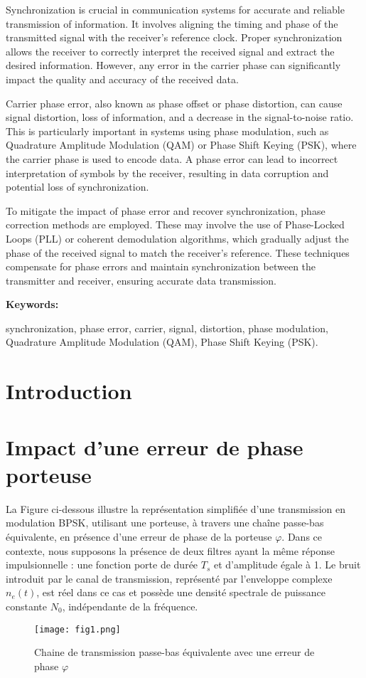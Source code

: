 \documentclass[11pt]{article}
\begin{document}
Synchronization is crucial in communication systems for accurate and reliable transmission of information. It involves aligning the timing and phase of the transmitted signal with the receiver's reference clock. Proper synchronization allows the receiver to correctly interpret the received signal and extract the desired information. However, any error in the carrier phase can significantly impact the quality and accuracy of the received data.

Carrier phase error, also known as phase offset or phase distortion, can cause signal distortion, loss of information, and a decrease in the signal-to-noise ratio. This is particularly important in systems using phase modulation, such as Quadrature Amplitude Modulation (QAM) or Phase Shift Keying (PSK), where the carrier phase is used to encode data. A phase error can lead to incorrect interpretation of symbols by the receiver, resulting in data corruption and potential loss of synchronization.

To mitigate the impact of phase error and recover synchronization, phase correction methods are employed. These may involve the use of Phase-Locked Loops (PLL) or coherent demodulation algorithms, which gradually adjust the phase of the received signal to match the receiver's reference. These techniques compensate for phase errors and maintain synchronization between the transmitter and receiver, ensuring accurate data transmission.

{\bfseries Keywords:}

synchronization, phase error, carrier, signal, distortion, phase modulation, Quadrature Amplitude Modulation (QAM), Phase Shift Keying (PSK).

\newpage
\tableofcontents
\listoffigures

\newpage
\section{Introduction}

\section{Impact d'une erreur de phase porteuse}
La Figure ci-dessous illustre la représentation simplifiée d'une transmission en modulation BPSK, utilisant une porteuse, à travers une chaîne passe-bas équivalente, en présence d'une erreur de phase de la porteuse $\varphi$. Dans ce contexte, nous supposons la présence de deux filtres ayant la même réponse impulsionnelle : une fonction porte de durée $T_s$ et d'amplitude égale à 1. Le bruit introduit par le canal de transmission, représenté par l'enveloppe complexe $n_e(t)$, est réel dans ce cas et possède une densité spectrale de puissance constante $N_0$, indépendante de la fréquence.
\begin{figure}[ht!]
    \centering
    \texttt{[image: fig1.png]}
    \caption{Chaine de transmission passe-bas équivalente avec une erreur de phase $\varphi$ \label{fig : chainepassebasequiv}}
\end{figure}
\end{document}
